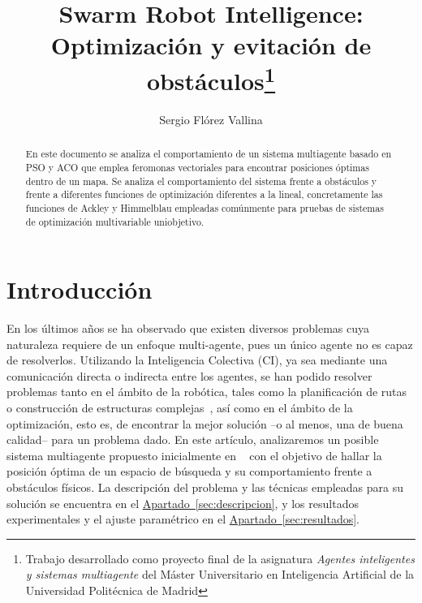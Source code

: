 \documentclass[runningheads]{llncs}
\newcommand{\refcruzada}[2]{\hyperref[#2]{#1~\ref{#2}}}
\begin{document}
    \title{Swarm Robot Intelligence: Optimización y evitación de obstáculos\thanks{Trabajo desarrollado como proyecto final de la asignatura \textit{Agentes inteligentes y sistemas multiagente} del Máster Universitario en Inteligencia Artificial de la Universidad Politécnica de Madrid}}
    \author{Sergio Flórez Vallina}

    \maketitle              %
    \begin{abstract}
        En este documento se analiza el comportamiento de un sistema multiagente basado en PSO y ACO
        que emplea feromonas vectoriales para encontrar posiciones óptimas dentro de un mapa. 
        Se analiza el comportamiento del sistema frente a obstáculos y frente a diferentes funciones
        de optimización diferentes a la lineal, concretamente las funciones de Ackley y Himmelblau
        empleadas comúnmente para pruebas de sistemas de optimización multivariable uniobjetivo.

    \end{abstract}

    \section{Introducción}
    En los últimos años se ha observado que existen diversos problemas cuya naturaleza requiere de un enfoque multi-agente, pues un único agente no es capaz de resolverlos.
    Utilizando la Inteligencia Colectiva (CI), ya sea mediante una comunicación directa o indirecta entre los agentes, se han podido resolver problemas tanto en el ámbito de la robótica, tales como la planificación de rutas o construcción de estructuras complejas~\cite{collectiveConstruction}, así como en el ámbito de la optimización, esto es, de encontrar la mejor solución --o al menos, una de buena calidad-- para un problema dado.
    En este artículo, analizaremos un posible sistema multiagente propuesto inicialmente en ~\cite{initialPaper}  con el objetivo de hallar la posición óptima de un espacio de búsqueda y su comportamiento frente a obstáculos físicos.
    La descripción del problema y las técnicas empleadas para su solución se encuentra en el \refcruzada{Apartado}{sec:descripcion}, y los resultados experimentales y el ajuste paramétrico en el \refcruzada{Apartado}{sec:resultados}.
    
\end{document}
